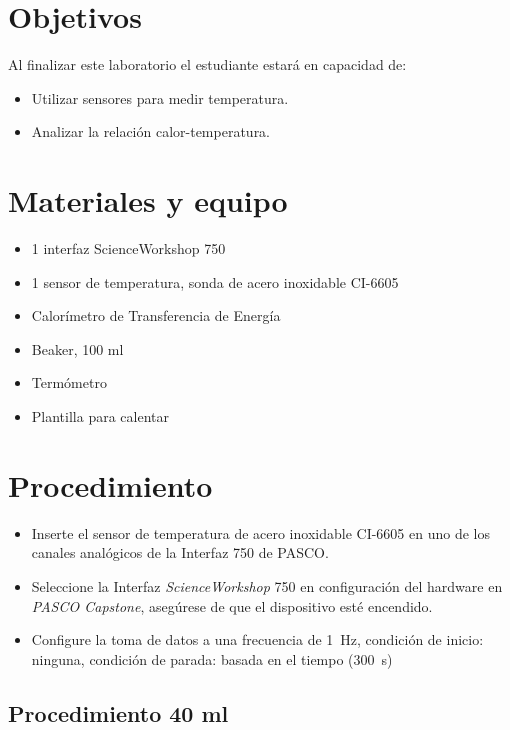 \documentclass[12pt,letterpaper]{report}
\newcommand{\obj}{Objetivos}
\newcommand{\mat}{Materiales y equipo}
\newcommand{\pro}{Procedimiento}
\newcommand{\capacidad}{Al finalizar este laboratorio el estudiante estará en capacidad de:}
\begin{document}
\section{\obj}
\capacidad
\begin{itemize}
\item Utilizar sensores para medir temperatura.
\item Analizar la relación calor-temperatura.
\end{itemize}

\section{\mat}
\begin{itemize}
\item 1 interfaz ScienceWorkshop\,\textregistered\,750
\item 1 sensor de temperatura, sonda de acero inoxidable CI-6605
\item Calorímetro de Transferencia de Energía
\item Beaker, 100 ml
\item Termómetro
\item Plantilla para calentar
\end{itemize}


\section{\pro}

\begin{itemize}
    \item Inserte el sensor de temperatura de acero inoxidable CI-6605 en uno de los canales analógicos de la Interfaz 750 de PASCO.
    \item Seleccione la Interfaz \textit{ScienceWorkshop} 750 en configuración del hardware en \textit{PASCO Capstone}, asegúrese de que el dispositivo esté encendido.
    \item Configure la toma de datos a una frecuencia de \SI{1}{\hertz}, condición de inicio: ninguna, condición de parada: basada en el tiempo (\SI{300 }{\second}) 
\end{itemize}

\subsection{Procedimiento 40 ml}
\end{document}
